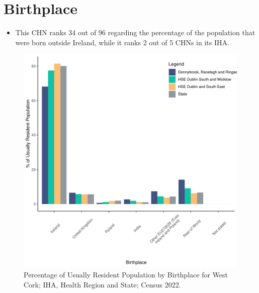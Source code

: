 \documentclass{article}
\begin{document}
\section{Birthplace}\label{sect:Birth}
\begin{itemize}
\item This CHN ranks  34 out of 96 regarding the percentage of the population that were born outside Ireland, while it ranks  2 out of 5 CHNs in its IHA.
\end{itemize}
\begin{figure}[H]
	\centering
	\includegraphics[width = 130mm]{../figures/BirthED.pdf}
	\caption{Percentage of Usually Resident Population by Birthplace for West Cork; IHA, Health Region and State; Census 2022.}
	\label{fig:vbnv}
	\end{figure}
	
\end{document}
